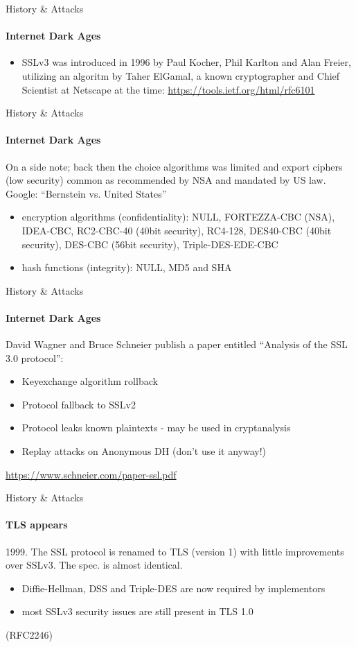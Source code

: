 \documentclass[hyperref={draft}]{beamer}
\begin{document}
\begin{frame}{History \& Attacks}
  \framesubtitle{Internet Dark Ages}
  \begin{itemize}
    \item SSLv3 was introduced in 1996 by Paul Kocher, Phil Karlton and Alan Freier, utilizing an algoritm by Taher ElGamal, a known cryptographer and Chief Scientist at Netscape at the time: \url{https://tools.ietf.org/html/rfc6101}
  \end{itemize}
\end{frame}

\begin{frame}{History \& Attacks}
  \framesubtitle{Internet Dark Ages}
  On a side note; back then the choice algorithms was limited and export ciphers (low security) common as recommended by NSA and mandated by US law. Google: ``Bernstein vs. United States''
  \begin{itemize}
    \item encryption algorithms (confidentiality): NULL, FORTEZZA-CBC (NSA), IDEA-CBC, RC2-CBC-40 (40bit security), RC4-128, DES40-CBC (40bit security), DES-CBC (56bit security), Triple-DES-EDE-CBC
    \item hash functions (integrity): NULL, MD5 and SHA
  \end{itemize}
\end{frame}

\begin{frame}{History \& Attacks}
  \framesubtitle{Internet Dark Ages}
  David Wagner and Bruce Schneier publish a paper entitled ``Analysis of the SSL 3.0 protocol'':
  \begin{itemize}
    \item Keyexchange algorithm rollback
    \item Protocol fallback to SSLv2
    \item Protocol leaks known plaintexts - may be used in cryptanalysis 
    \item Replay attacks on Anonymous DH (don't use it anyway!)
  \end{itemize}

  \vspace{50px}

  \tiny\url{https://www.schneier.com/paper-ssl.pdf}
\end{frame}

\begin{frame}{History \& Attacks}
  \framesubtitle{TLS appears}
  1999. The SSL protocol is renamed to TLS (version 1) with little improvements over SSLv3. The spec. is almost identical.
  \begin{itemize}
    \item Diffie-Hellman, DSS and Triple-DES are now required by implementors
    \item most SSLv3 security issues are still present in TLS 1.0
  \end{itemize}
  (RFC2246)
\end{frame}
\end{document}
